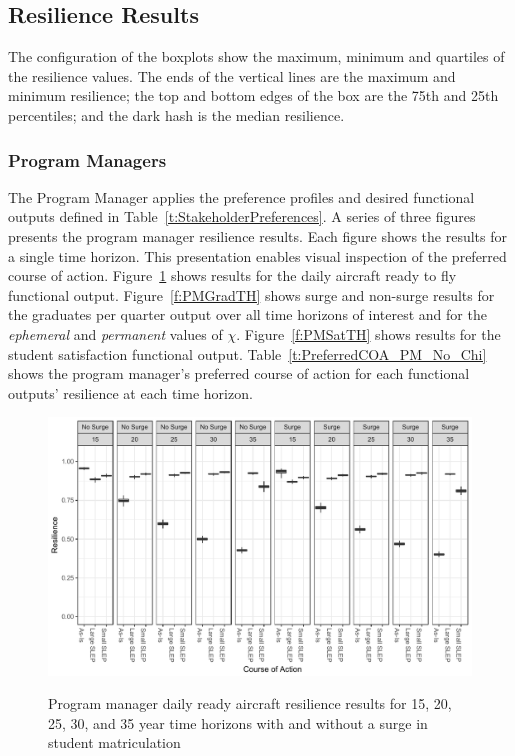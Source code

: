 \documentclass[preprint,12pt]{elsarticle}
\begin{document}
\subsection{Resilience Results}

The configuration of the boxplots show the maximum, minimum and
quartiles of the resilience values. The ends of the vertical lines are
the maximum and minimum resilience; the top and bottom edges  of the box are the
75th and 25th percentiles; and the dark hash is the median resilience.

\subsubsection{Program Managers}

The Program Manager applies the preference profiles and desired
functional outputs defined in
Table~\ref{t:StakeholderPreferences}. A series of three figures presents
the program manager resilience results. Each figure shows the results
for a single time horizon. This presentation enables visual inspection
of the preferred course of action.  Figure~\ref{f:PMAoTH} shows results for
the daily aircraft ready to fly functional
output. Figure~\ref{f:PMGradTH} shows surge and non-surge results for
the graduates per quarter output over all time horizons of interest
and for the \emph{ephemeral} and
\emph{permanent} values of $\chi$. Figure~\ref{f:PMSatTH} shows results for
the student satisfaction functional output. Table~\ref{t:PreferredCOA_PM_No_Chi} shows the program
manager's preferred course of action for each 
functional outputs' resilience at each time horizon. 

\begin{landscape}
\begin{figure}[h]
  \begin{center}
    \includegraphics[width=8.2in]{PMAoTH}
  \end{center}
\begin{quote}
  \caption[Program manager aircraft resilience results]{Program
    manager daily ready aircraft resilience results for 15, 20, 25, 30, and 35 
    year time horizons with and without a surge in student
    matriculation
  \label{f:PMAoTH}}
\end{quote}
\end{figure}
\end{landscape}
\end{document}
